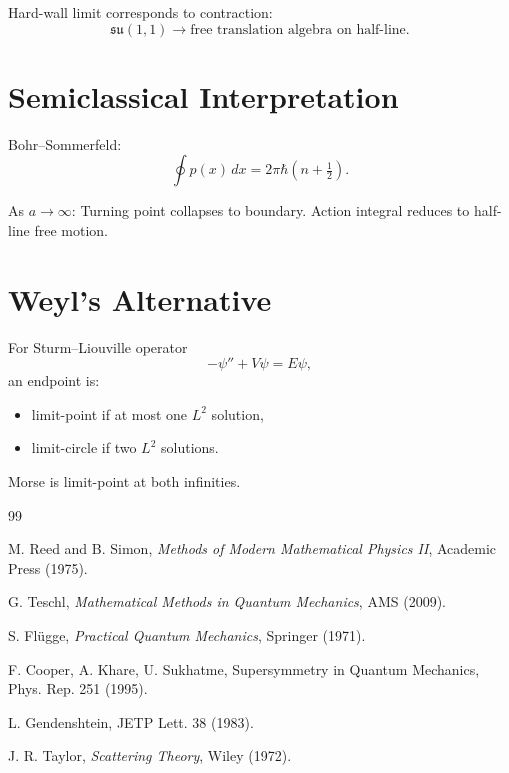\documentclass[12pt]{article}
\begin{document}
Hard-wall limit corresponds to contraction:
\[
\mathfrak{su}(1,1)
\longrightarrow
\text{free translation algebra on half-line}.
\]

\section{Semiclassical Interpretation}

Bohr–Sommerfeld:
\[
\oint p(x)\,dx
=
2\pi\hbar(n+\tfrac12).
\]

As $a\to\infty$:
Turning point collapses to boundary.
Action integral reduces to half-line free motion.

\appendix

\section{Weyl’s Alternative}

For Sturm–Liouville operator
\[
-\psi''+V\psi=E\psi,
\]
an endpoint is:

\begin{itemize}
\item limit-point if at most one $L^2$ solution,
\item limit-circle if two $L^2$ solutions.
\end{itemize}

Morse is limit-point at both infinities.

\begin{thebibliography}{99}

M. Reed and B. Simon,
\textit{Methods of Modern Mathematical Physics II},
Academic Press (1975).

G. Teschl,
\textit{Mathematical Methods in Quantum Mechanics},
AMS (2009).

S. Fl\"ugge,
\textit{Practical Quantum Mechanics},
Springer (1971).

F. Cooper, A. Khare, U. Sukhatme,
Supersymmetry in Quantum Mechanics,
Phys. Rep. 251 (1995).

L. Gendenshtein,
JETP Lett. 38 (1983).

J. R. Taylor,
\textit{Scattering Theory},
Wiley (1972).

\end{thebibliography}
\end{document}

